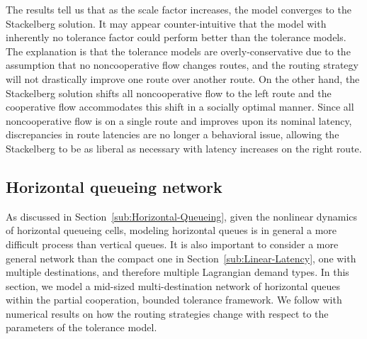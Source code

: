 The results tell us that as the scale factor increases, the model
converges to the Stackelberg solution. It may appear counter-intuitive
that the model with inherently no tolerance factor could perform better
than the tolerance models. The explanation is that the tolerance models
are overly-conservative due to the assumption that no noncooperative
flow changes routes, and the routing strategy will not drastically
improve one route over another route. On the other hand, the Stackelberg
solution shifts all noncooperative flow to the left route and the
cooperative flow accommodates this shift in a socially optimal manner.
Since all noncooperative flow is on a single route and improves upon
its nominal latency, discrepancies in route latencies are no longer
a behavioral issue, allowing the Stackelberg to be as liberal as necessary
with latency increases on the right route.


\subsection{Horizontal queueing network\label{sub:Horizontal-Queueing-Network:}}

\begin{figure}[h]
\centering
{}\hfill%
%
\end{figure}

As discussed in Section~\ref{sub:Horizontal-Queueing}, given the
nonlinear dynamics of horizontal queueing cells, modeling horizontal
queues is in general a more difficult process than vertical queues.
It is also important to consider a more general network than the compact
one in Section~\ref{sub:Linear-Latency}, one with multiple destinations,
and therefore multiple Lagrangian demand types. In this section, we
model a mid-sized multi-destination network of horizontal queues within
the partial cooperation, bounded tolerance framework. We follow with
numerical results on how the routing strategies change with respect
to the parameters of the tolerance model.


